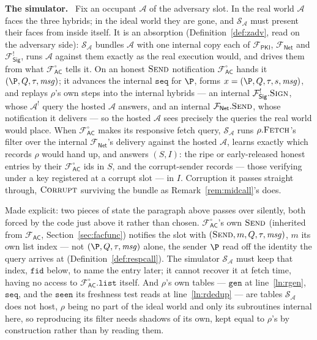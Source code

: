 \documentclass[10pt,oneside,openany]{book}
\newcommand{\Adv}{\mathcal{A}}
\newcommand{\Sim}{\mathcal{S}}
\newcommand{\op}[1]{\textnormal{\textsc{#1}}}
\newcommand{\Fsig}{\mathcal{F}_{\mathsf{Sig}}}
\newcommand{\Fnet}{\mathcal{F}_{\mathsf{Net}}}
\newcommand{\Fac}{\mathcal{F}_{\mathsf{AC}}}
\newcommand{\Facz}{\mathcal{F}^{\circ}_{\mathsf{AC}}}
\newcommand{\Fpki}{\mathcal{F}_{\mathsf{PKI}}}
\newcommand{\msg}{\mathit{msg}}
\newcommand{\V}[1]{\mathtt{#1}}
\newcommand{\heading}[1]{\medskip\par\noindent\textcolor{accent}{\textbf{#1.}}\ }
\theoremstyle{accentdef}
\theoremstyle{accentplain}
\begin{document}
\heading{The simulator} Fix an occupant $\Adv$ of the adversary slot. In the real world $\Adv$
faces the three hybrids; in the ideal world they are gone, and $\Sim_{\Adv}$ must present their
faces from inside itself. It is an absorption (Definition~\ref{def:zadv}, read on the adversary
side): $\Sim_{\Adv}$ bundles $\Adv$ with one internal copy each of $\Fpki$, $\Fnet$ and
$\Fsig^{!}$, runs $\Adv$ against them exactly as the real execution would, and drives them from
what $\Facz$ tells it. On an honest $\op{Send}$ notification $\Facz$ hands it $(\P,Q,\tau,\msg)$;
it advances the internal $\V{seq}$ for $\P$, forms $x = (\P,Q,\tau,s,\msg)$, and replays $\rho$'s
own steps into the internal hybrids --- an internal $\Fsig^{!}.\op{Sign}$, whose $\Adv^{!}$ query
the hosted $\Adv$ answers, and an internal $\Fnet.\op{Send}$, whose notification it delivers ---
so the hosted $\Adv$ sees precisely the queries the real world would place. When $\Facz$ makes its
responsive fetch query, $\Sim_{\Adv}$ runs $\rho.\op{Fetch}$'s filter over the internal $\Fnet$'s
delivery against the hosted $\Adv$, learns exactly which records $\rho$ would hand up, and answers
$(S,I)$: the ripe or early-released honest entries by their $\Facz$ ids in $S$, and the
corrupt-sender records --- those verifying under a key registered at a corrupt slot --- in $I$.
Corruption it passes straight through, $\op{Corrupt}$ surviving the bundle as
Remark~\ref{rem:midcall}'s does.

Made explicit: two pieces of state the paragraph above passes over silently, both forced by the
code just above it rather than chosen. $\Facz$'s own $\op{Send}$ (inherited from $\Fac$,
Section~\ref{sec:facfunc}) notifies the slot with $(\op{Send},m,Q,\tau,\msg)$, $m$ its own list
index --- not $(\P,Q,\tau,\msg)$ alone, the sender $\P$ read off the identity the query arrives at
(Definition~\ref{def:respcall}). The simulator $\Sim_{\Adv}$ must keep that index, $\V{fid}$ below, to name the
entry later; it cannot recover it at fetch time, having no access to $\Facz.\V{list}$ itself.
And $\rho$'s own tables --- $\V{gen}$ at line~\ref{ln:rgen}, $\V{seq}$, and the $\V{seen}$ its
freshness test reads at line~\ref{ln:rdedup} --- are tables $\Sim_{\Adv}$ does not host, $\rho$
being no part of the ideal world and only its subroutines internal here, so reproducing its
filter needs shadows of its own, kept equal to $\rho$'s by construction rather than by reading
them.
\end{document}
